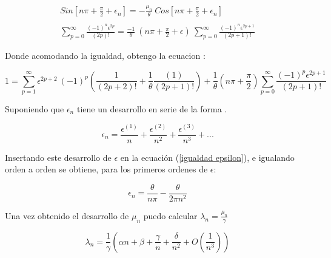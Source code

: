 \begin{equation}
\begin{array}{c}
    Sin[ n \pi + \frac{\pi}{2} + \epsilon _n ] = 
    - \frac{\mu _n}{\theta}  \ Cos[ n \pi + \frac{\pi}{2} + \epsilon _n ]  \\
 \\

         \sum _{p=0} ^{\infty} \frac{(-1) ^n  \epsilon ^{2 p }}{(2p)!} 
    =  \frac{-1}{\theta}  \ (n \pi + \frac{\pi}{2} + \epsilon ) \
     \sum _{p=0} ^{\infty} \frac{(-1) ^n \epsilon ^{2 p + 1}}{(2p+1)!} 
\end{array}
\end{equation}


Donde acomodando la igualdad, obtengo la ecuacion :

\begin{equation}
    1 = \sum _{p=1} ^{\infty} \epsilon ^{2p+2} \ (-1) ^p
    \left( 
    \frac{1}{(2p+2)!} + \frac{1}{\theta} \frac{(1 )}{(2p+1)!} 
    \right ) +
    \frac{1}{\theta} \left(n \pi + \frac{\pi}{2} \right)
    \sum _{p=0} ^{\infty} \frac{(-1) ^p \epsilon ^{2p+1}}{(2p+1) !}
\label{igualdad epsilon}
\end{equation}

Suponiendo que $\epsilon _n $ tiene un desarrollo en serie de la forma .

\begin{equation}
    \epsilon _n = 
    \frac{\epsilon ^{(1)}}{n}  + 
    \frac{\epsilon ^{(2)}}{n ^2}  + 
    \frac{\epsilon ^{(3)}}{n ^3}  + ...
\label{eq.epsilon}
\end{equation}


Insertando este desarrollo de $\epsilon$ en la ecuación (\ref{igualdad epsilon}), e igualando orden a orden se obtiene, para los primeros ordenes de $\epsilon$:

\begin{equation}
    \epsilon _n = \frac{\theta}{n \pi} 
     - \frac{ \theta}{2 \pi n ^2 } 
\label{epsilons}
\end{equation}

Una vez obtenido el desarrollo de $\mu _n $ puedo calcular $\lambda _n = \frac{\mu _n }{\gamma}  $ 



\begin{equation}
    \lambda _n = 
    \frac{1}{\gamma}
    \left(
    \alpha n + 
    \beta + 
    \frac{\gamma}{n} +
    \frac{\delta}{n ^2} +
    O(\frac{1}{n^3} ) 
    \right)
\end{equation}
    

